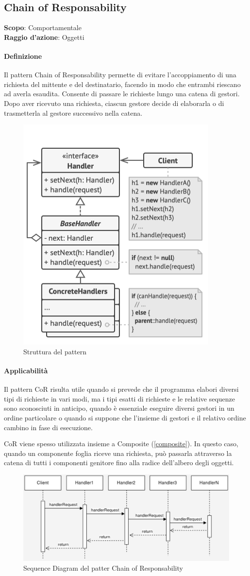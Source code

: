 \subsection{Chain of Responsability}
\label{chain-of-responsability}

\textbf{Scopo}: Comportamentale \\
\textbf{Raggio d'azione}: Oggetti

\paragraph{Definizione} Il pattern Chain of Responsability permette di evitare l'accoppiamento di una richiesta del mittente e del destinatario, facendo in modo che entrambi riescano ad averla esaudita. Consente di passare le richieste lungo una catena di gestori. Dopo aver ricevuto una richiesta, ciascun gestore decide di elaborarla o di trasmetterla al gestore successivo nella catena.

\begin{figure}[H]
    \centering
    \includegraphics[width=0.4\linewidth]{assets/pattern/chain-of-responsability/cor-struttura.png}
    \caption{Struttura del pattern}
\end{figure}

\paragraph{Applicabilità} Il pattern CoR risulta utile quando si prevede che il programma elabori diversi tipi di richieste in vari modi, ma i tipi esatti di richieste e le relative sequenze sono sconosciuti in anticipo, quando è essenziale eseguire diversi gestori in un ordine particolare o quando si suppone che l'insieme di gestori e il relativo ordine cambino in fase di esecuzione.

CoR viene spesso utilizzata insieme a Composite (\ref{composite}). In questo caso, quando un componente foglia riceve una richiesta, può passarla attraverso la catena di tutti i componenti genitore fino alla radice dell'albero degli oggetti.

\begin{figure}[H]
    \centering
    \includegraphics[width=0.8\linewidth]{assets/pattern/chain-of-responsability/cor-sequence.png}
    \caption{Sequence Diagram del patter Chain of Responsability}
\end{figure}

\newpage